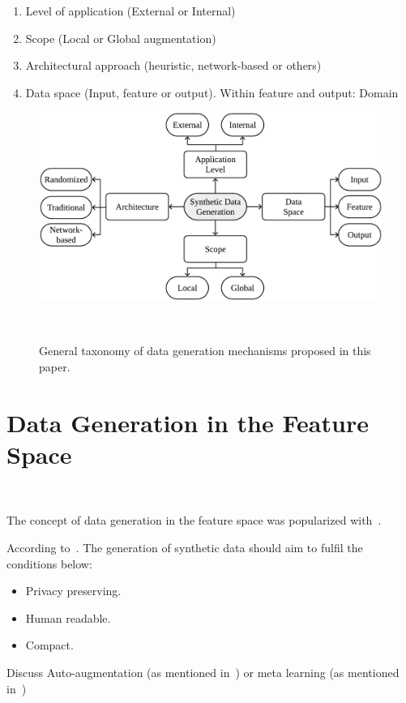 \documentclass[parskip=full]{scrartcl}
\begin{document}
\begin{enumerate}
    \item Level of application (External or Internal)
    \item Scope (Local or Global augmentation)
    \item Architectural approach (heuristic, network-based or others)
    \item Data space (Input, feature or output). Within feature and output: Domain
\end{enumerate}

\begin{figure}
	\centering
	\includegraphics[width=.8\linewidth]{../analysis/data-generation-taxonomy}
    \caption{General taxonomy of data generation mechanisms proposed in this
        paper.
    }~\label{fig:data-generation-taxonomy}
\end{figure}


\section{Data Generation in the Feature Space}~\label{sec:feature-space}

The concept of data generation in the feature space was popularized
with~\cite{devries2017dataset}.

According to~\cite{assefa2020generating}. The generation of synthetic data
should aim to fulfil the conditions below:

\begin{itemize}
    \item Privacy preserving.
    \item Human readable.
    \item Compact.
\end{itemize}

Discuss Auto-augmentation (as mentioned in~\cite{wang2020survey}) or meta
learning (as mentioned in~\cite{shorten2019survey})
\end{document}
